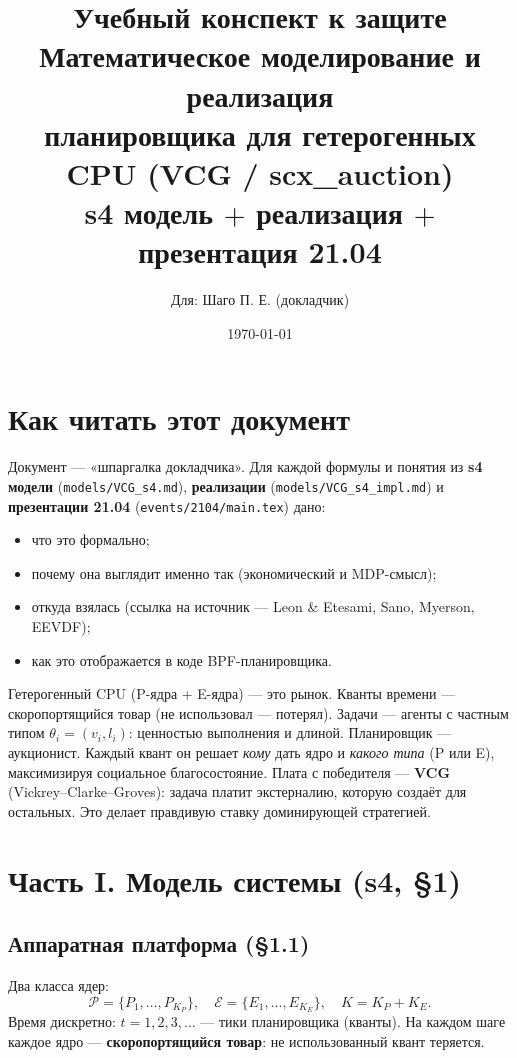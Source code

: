 \documentclass[11pt,a4paper]{article}
\title{\textbf{Учебный конспект к защите}\\[0.3em]
{\large Математическое моделирование и реализация\\
планировщика для гетерогенных CPU (VCG / scx\_auction)}\\[0.6em]
{\normalsize\color{MainRed}s4 модель $+$ реализация $+$ презентация 21.04}}
\author{Для: Шаго П. Е. (докладчик)}
\date{\today}
\begin{document}
\maketitle
\tableofcontents
\newpage

\section{Как читать этот документ}

Документ — «шпаргалка докладчика». Для каждой формулы и понятия из
\textbf{s4 модели} (\texttt{models/VCG\_s4.md}), \textbf{реализации}
(\texttt{models/VCG\_s4\_impl.md}) и \textbf{презентации 21.04}
(\texttt{events/2104/main.tex}) дано:

\begin{itemize}
  \item что это формально;
  \item почему она выглядит именно так (экономический и MDP-смысл);
  \item откуда взялась (ссылка на источник — Leon \& Etesami, Sano,
    Myerson, EEVDF);
  \item как это отображается в коде BPF-планировщика.
\end{itemize}

\begin{why}
Гетерогенный CPU (P-ядра + E-ядра) — это рынок. Кванты времени —
скоропортящийся товар (не использовал — потерял). Задачи — агенты с
частным типом $\theta_i=(v_i,l_i)$: ценностью выполнения и длиной.
Планировщик — аукционист. Каждый квант он решает \emph{кому} дать ядро
и \emph{какого типа} (P или E), максимизируя социальное благосостояние.
Плата с победителя — \textbf{VCG} (Vickrey--Clarke--Groves): задача
платит экстерналию, которую создаёт для остальных. Это делает
правдивую ставку доминирующей стратегией.
\end{why}

\section{Часть I. Модель системы (s4, §1)}

\subsection{Аппаратная платформа (§1.1)}

Два класса ядер:
\[
\mathcal{P} = \{P_1,\ldots,P_{K_P}\},\quad
\mathcal{E} = \{E_1,\ldots,E_{K_E}\},\quad
K = K_P + K_E.
\]
Время дискретно: $t=1,2,3,\ldots$ — тики планировщика (кванты).
На каждом шаге каждое ядро — \textbf{скоропортящийся товар}: не
использованный квант теряется.
\end{document}
